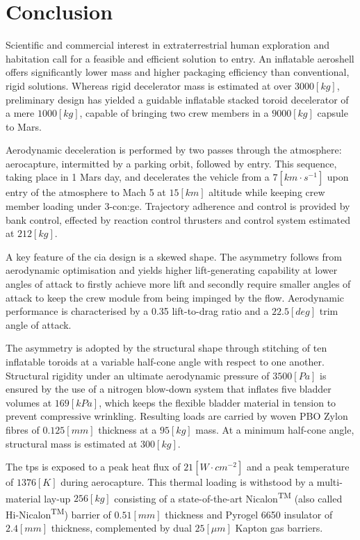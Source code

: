 \section{Conclusion}

Scientific and commercial interest in extraterrestrial human exploration and habitation call for a feasible and efficient solution to entry. An inflatable aeroshell offers significantly lower mass and higher packaging efficiency than conventional, rigid solutions. Whereas rigid decelerator mass is estimated at over $3000 \left[kg\right] $, preliminary design has yielded a guidable inflatable stacked toroid decelerator of a mere $1000 \left[kg\right]$, capable of bringing two crew members in a $9000 \left[kg\right]$ capsule to Mars.

Aerodynamic deceleration is performed by two passes through the atmosphere: aerocapture, intermitted by a parking orbit, followed by entry. This sequence, taking place in 1 Mars day, and decelerates the vehicle from a $7 \left[km\cdot s^{-1}\right]$ upon entry of the atmosphere to Mach 5 at $15 \left[km\right]$ altitude while keeping crew member loading under 3-\gls{con:ge}. Trajectory adherence and control is provided by bank control, effected by reaction control thrusters and control system estimated at $212 \left[kg\right]$.

A key feature of the \gls{cia} design is a skewed shape. The asymmetry follows from aerodynamic optimisation and yields higher lift-generating capability at lower angles of attack to firstly achieve more lift and secondly require smaller angles of attack to keep the crew module from being impinged by the flow. Aerodynamic performance is characterised by a 0.35 lift-to-drag ratio and a $22.5 \left[deg\right]$ trim angle of attack.

The asymmetry is adopted by the structural shape through stitching of ten inflatable toroids at a variable half-cone angle with respect to one another. Structural rigidity under an ultimate aerodynamic pressure of $3500 \left[Pa\right]$ is ensured by the use of a nitrogen blow-down system that inflates five bladder volumes at $169 \left[kPa\right]$, which keeps the flexible bladder material in tension to prevent compressive wrinkling. Resulting loads are carried by woven PBO Zylon\textsuperscript{\textregistered} fibres of $0.125 \left[mm\right]$ thickness at a $95 \left[kg\right]$ mass. At a minimum half-cone angle, structural mass is estimated at $300 \left[kg\right]$. 

The \acrlong{tps} is exposed to a peak heat flux of $21 \left[W\cdot cm^{-2}\right]$ and a peak temperature of $1376 \left[ K \right] $ during aerocapture. This thermal loading is withstood by a multi-material lay-up $256 \left[ kg \right] $ consisting of a state-of-the-art Nicalon\textsuperscript{TM} (also called Hi-Nicalon\textsuperscript{TM}) barrier of $0.51 \left[ mm \right] $  thickness and Pyrogel\textsuperscript{\textregistered} 6650 insulator of $2.4 \left[ mm \right] $  thickness, complemented by dual $25 \left[ \mu m \right] $  Kapton gas barriers. 

